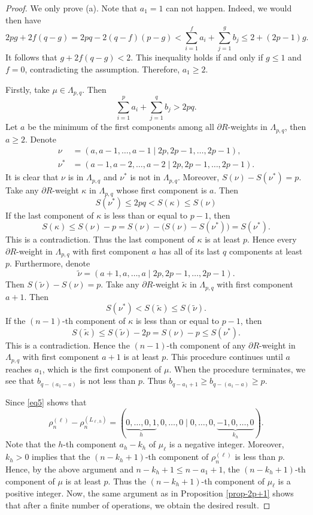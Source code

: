 \documentclass[11pt]{amsart}
\theoremstyle{plain}
\theoremstyle{definition}
\begin{document}
\begin{proof}
	We  only prove (a).  Note that $a_1=1$ can not happen. Indeed, we would then have
	\[2pg+2f(q-g)=2pq-2(q-f)(p-g)<\sum_{i=1}^f a_i+\sum_{j=1}^g b_j\le 2+(2p-1)g.\]
  It follows that $g+2f(q-g)<2$. This inequality holds if and only if $g\le 1$ and $f=0$, contradicting the assumption. Therefore, $a_1\ge 2$.


Firstly, take $\mu\in\Lambda_{p, q}$. Then
	\[\sum_{i=1}^pa_i+\sum_{j=1}^qb_j>2pq.\]
	Let $a$ be the minimum of the first components among all $\partial R$-weights in $\Lambda_{p,q}$, then $a\ge 2$. Denote
	\begin{align*}
		\nu&=(a,a-1,\dots,a-1\mid 2p,2p-1,\dots,2p-1), \\
		\nu^*&=(a-1,a-2,\dots,a-2\mid 2p,2p-1,\dots,2p-1).
	\end{align*}
	It is clear that $\nu$ is in $\Lambda_{p,q}$ and $\nu^*$ is not in $\Lambda_{p,q}$. Moreover, $S(\nu)-S(\nu^*)=p$.
Take any $\partial R$-weight $\kappa$ in $\Lambda_{p,q}$ whose first component is $a$. Then
$$
S(\nu^*)\le 2pq< S(\kappa)\leq S(\nu)
$$
If the last component of $\kappa$ is less than or equal to $p-1$, then
$$
S(\kappa)\leq S(\nu)-p=S(\nu)-\big(S(\nu)-S(\nu^*)\big)=S(\nu^*).
$$
This is a contradiction. Thus the last component of $\kappa$ is at least $p$. Hence every $\partial R$-weight in $\Lambda_{p,q}$ with first component $a$ has all of its last $q$ components at least $p$. Furthermore, denote
	\[\widetilde{\nu}=(a+1,a,\dots,a\mid 2p,2p-1,\dots,2p-1).\]
	Then $S(\widetilde{\nu})-S(\nu)=p$.
Take any $\partial R$-weight $\widetilde{\kappa}$ in $\Lambda_{p,q}$ with first component $a+1$. Then
$$
S(\nu^*)<S(\widetilde{\kappa})\leq S(\widetilde{\nu}).
 $$
If the $(n-1)$-th component of $\kappa$ is less than or equal to $p-1$, then
$$
S(\widetilde{\kappa})\leq S(\widetilde{\nu})-2p=S(\nu)-p\leq S(\nu^*).
$$
This is a contradiction. Hence the $(n-1)$-th component of any $\partial R$-weight in $\Lambda_{p,q}$ with first component $a+1$ is at least $p$. This procedure continues until $a$ reaches $a_1$,  which is the first component of $\mu$. When the procedure terminates, we see that $b_{q-(a_1-a)}$ is not less than $p$. Thus $b_{q-a_1+1}\ge b_{q-(a_1-a)}\ge p$.
	
	Since \eqref{eq5} shows that
	\[\rho_n^{(\ell)}-\rho_n^{(L_{\ell, h})}=(\underbrace{0,\dots,0,1}_{h},0,\dots,0\mid 0,\dots,0,\underbrace{-1,0,\dots,0}_{k_{h}}).\]
	Note that the $h$-th component $a_h-k_h$ of $\mu_\ell$ is a negative integer. Moreover, $k_h>0$ implies that the $(n-k_h+1)$-th component of $\rho_n^{(\ell)}$ is less than $p$. Hence, by the above argument and $n-k_h+1\le n-a_1+1$, the $(n-k_h+1)$-th component of $\mu$ is at least $p$. Thus the $(n-k_h+1)$-th component of $\mu_\ell$ is a positive integer. Now, the same argument as in Proposition \ref{prop-2p+1} shows that after a finite number of operations, we obtain the desired result.
	

\end{proof}
\end{document}
